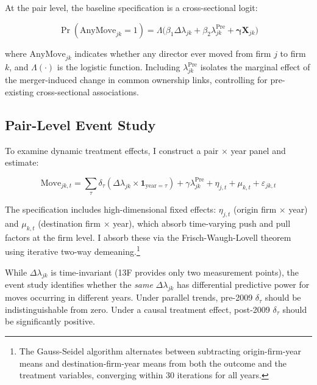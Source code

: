 \documentclass[11pt,a4paper]{article}
\begin{document}
At the pair level, the baseline specification is a cross-sectional logit:

\begin{equation}\label{eq:pair_logit}
\Pr(\text{AnyMove}_{jk}=1) = \Lambda\big(\beta_1 \Delta\lambda_{jk} + \beta_2 \lambda_{jk}^{\text{Pre}} + \boldsymbol{\gamma} \mathbf{X}_{jk}\big)
\end{equation}

where $\text{AnyMove}_{jk}$ indicates whether any director ever moved from firm $j$ to firm $k$, and $\Lambda(\cdot)$ is the logistic function. Including $\lambda_{jk}^{\text{Pre}}$ isolates the marginal effect of the merger-induced change in common ownership links, controlling for pre-existing cross-sectional associations.

\subsection{Pair-Level Event Study}

To examine dynamic treatment effects, I construct a pair $\times$ year panel and estimate:

\begin{equation}\label{eq:pair_event}
\text{Move}_{jk,t} = \sum_{\tau} \delta_\tau (\Delta\lambda_{jk} \times \mathbf{1}_{\text{year}=\tau}) + \gamma \lambda_{jk}^{\text{Pre}} + \eta_{j,t} + \mu_{k,t} + \varepsilon_{jk,t}
\end{equation}

The specification includes high-dimensional fixed effects: $\eta_{j,t}$ (origin firm $\times$ year) and $\mu_{k,t}$ (destination firm $\times$ year), which absorb time-varying push and pull factors at the firm level. I absorb these via the Frisch-Waugh-Lovell theorem using iterative two-way demeaning.\footnote{The Gauss-Seidel algorithm alternates between subtracting origin-firm-year means and destination-firm-year means from both the outcome and the treatment variables, converging within 30 iterations for all years.}

While $\Delta\lambda_{jk}$ is time-invariant (13F provides only two measurement points), the event study identifies whether the \textit{same} $\Delta\lambda_{jk}$ has differential predictive power for moves occurring in different years. Under parallel trends, pre-2009 $\delta_\tau$ should be indistinguishable from zero. Under a causal treatment effect, post-2009 $\delta_\tau$ should be significantly positive.

\newpage

\end{document}
